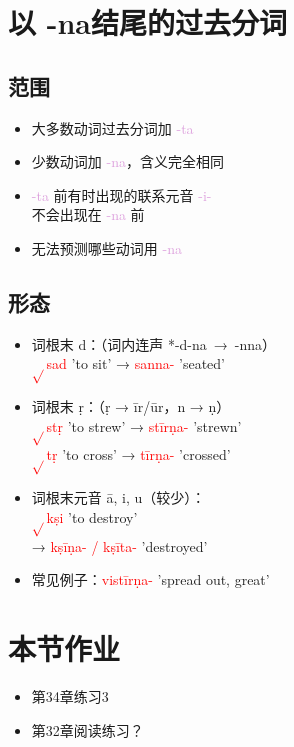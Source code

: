 \documentclass[17pt]{beamer}
\newcommand{\verbroot}[1]{\textcolor{red}{$\sqrt{}$#1}}
\newcommand{\nounstem}[1]{\textcolor{red}{#1\nobreakdash-}}
\newcommand{\pratyaya}[1]{\mbox{\textcolor{Plum}{#1}}}
\begin{document}
\section[na分词]{以 -na结尾的过去分词}
\begin{frame}{\insertsection}
  \small
  \tableofcontents[currentsection]
\end{frame}

\subsection{范围}
\begin{frame}{\insertsubsection}
  \begin{itemize}
    \item 大多数动词过去分词加 \pratyaya{-ta}
    \item 少数动词加 \pratyaya{-na}，含义完全相同
    \item \pratyaya{-ta} 前有时出现的联系元音 \pratyaya{-i-}\\
      不会出现在 \pratyaya{-na} 前
    \item 无法预测哪些动词用 \pratyaya{-na}
  \end{itemize}
\end{frame}

\subsection{形态}
\begin{frame}{\insertsubsection}
  \small
  \begin{itemize}
    \item 词根末 d：（词内连声 \mbox{*-d-na → -nna}）\\
      \verbroot{sad} 'to sit' → \nounstem{sanna} 'seated'
    \item 词根末 ṛ：（ṛ → īr/ūr，n → ṇ）\\
      \verbroot{stṛ} 'to strew' → \nounstem{stīrṇa} 'strewn'\\
      \verbroot{tṛ} 'to cross' → \nounstem{tīrṇa} 'crossed'
    \item 词根末元音 ā, i, u（较少）：\\
      \verbroot{kṣi} 'to destroy' \\ → \nounstem{kṣīṇa- / kṣīta} 'destroyed'  \\
    \item 常见例子：\mbox{\nounstem{vistīrṇa}} 'spread out, great'
  \end{itemize}
\end{frame}

\section{本节作业}

\begin{frame}{\insertsection }
  \begin{itemize}
    \item
      第34章练习3
    \item 第32章阅读练习？
  \end{itemize}
\end{frame}
\end{document}
